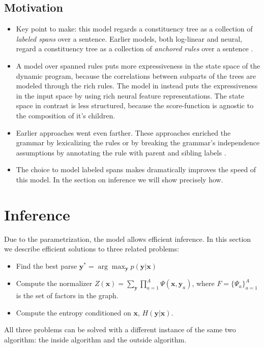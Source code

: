 \subsection{Motivation}
\begin{itemize}
  \item Key point to make: this model regards a constituency tree as a collection of \textit{labeled spans} over a sentence. Earlier models, both log-linear and neural, regard a constituency tree as a collection of \textit{anchored rules} over a sentence \citep{finkel2008crf,klein2015crf}.
  \item A model over spanned rules puts more expressiveness in the state space of the dynamic program, because the correlations between subparts of the trees are modeled through the rich rules. The model in \citet{stern2017minimal} instead puts the expressiveness in the input space by using rich neural feature representations. The state space in contrast is less structured, because the score-function is agnostic to the composition of it's children.
  \item Earlier approaches went even farther. These approaches enriched the grammar by lexicalizing the rules \citep{collins2003head} or by breaking the grammar's independence assumptions by annotating the rule with parent and sibling labels \citep{klein2003accurate}.
  \item The choice to model labeled spans makes dramatically improves the speed of this model. In the section on inference we will show precisely how.
\end{itemize}

\section{Inference}
Due to the parametrization, the model allows efficient inference. In this section we describe efficient solutions to three related problems:
\begin{itemize}
  \item Find the best parse $\mathbf{y}^{*} = \arg \max_{\mathbf{y}} p(\mathbf{y} | \mathbf{x})$
  \item Compute the normalizer $Z(\mathbf{x}) = \sum_{ \mathbf{y} } \prod_{ a=1 }^{ A } \Psi( \mathbf{x}, \mathbf{y}_a )$, where $F = \{ \Psi_a \}_{a=1}^{A}$ is the set of factors in the graph.
  \item Compute the entropy conditioned on $\mathbf{x}$, $H(\mathbf{y} | \mathbf{x})$.
\end{itemize}
All three problems can be solved with a different instance of the same two algorithm: the inside algorithm and the outside algorithm.


